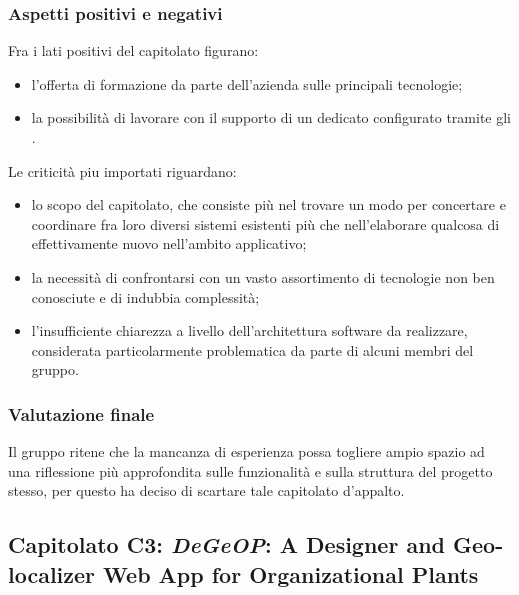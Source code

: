 		\subsubsection{Aspetti positivi e negativi}
		Fra i lati positivi del capitolato figurano:
		\begin{itemize}
			\item l'offerta di formazione da parte dell'azienda sulle principali tecnologie;
			\item la possibilità di lavorare con il supporto di un  dedicato configurato tramite gli .
		\end{itemize}
		Le criticità piu importati riguardano:
		\begin{itemize}
			\item lo scopo del capitolato, che consiste più nel trovare un modo per concertare e coordinare fra loro diversi sistemi 
			esistenti più che nell'elaborare qualcosa di effettivamente nuovo nell'ambito applicativo;
			\item la necessità di confrontarsi con un vasto assortimento di tecnologie non ben conosciute e di indubbia complessità;
			\item l'insufficiente chiarezza a livello dell'architettura software da realizzare, considerata particolarmente problematica da 
			parte di alcuni membri del gruppo.
		\end{itemize}
		\subsubsection{Valutazione finale}
		Il gruppo ritene che la mancanza di esperienza possa togliere ampio spazio ad una riflessione più approfondita sulle funzionalità e sulla 
		struttura del progetto stesso, per questo ha deciso di scartare tale capitolato d'appalto.
		
	\subsection{Capitolato C3: \emph{DeGeOP}: A Designer and Geo-localizer Web App for Organizational Plants}
